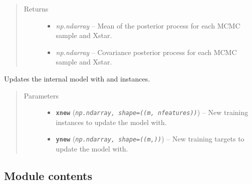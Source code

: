 \documentclass[letterpaper,10pt,english]{sphinxmanual}
\begin{document}
\begin{fulllineitems}
\begin{fulllineitems}
\begin{quote}
\begin{description}
\begin{itemize}
\end{itemize}

\item[{Returns}] \leavevmode
\begin{itemize}
\item {} 
\emph{np.ndarray} -- Mean of the posterior process for each MCMC sample and Xstar.

\item {} 
\emph{np.ndarray} -- Covariance posterior process for each MCMC sample and Xstar.

\end{itemize}


\end{description}\end{quote}

\end{fulllineitems}


\begin{fulllineitems}
\label{pyGPGO.surrogates.tStudentProcessMCMC:pyGPGO.surrogates.tStudentProcessMCMC.tStudentProcessMCMC.update}
Updates the internal model with  and  instances.
\begin{quote}\begin{description}
\item[{Parameters}] \leavevmode\begin{itemize}
\item {} 
\textbf{\texttt{xnew}} (\emph{\texttt{np.ndarray, shape=((m, nfeatures))}}) -- New training instances to update the model with.

\item {} 
\textbf{\texttt{ynew}} (\emph{\texttt{np.ndarray, shape=((m,))}}) -- New training targets to update the model with.

\end{itemize}

\end{description}\end{quote}

\end{fulllineitems}


\end{fulllineitems}



\subsection{Module contents}
\label{pyGPGO.surrogates:module-contents}\label{pyGPGO.surrogates:module-pyGPGO.surrogates}
\end{document}
